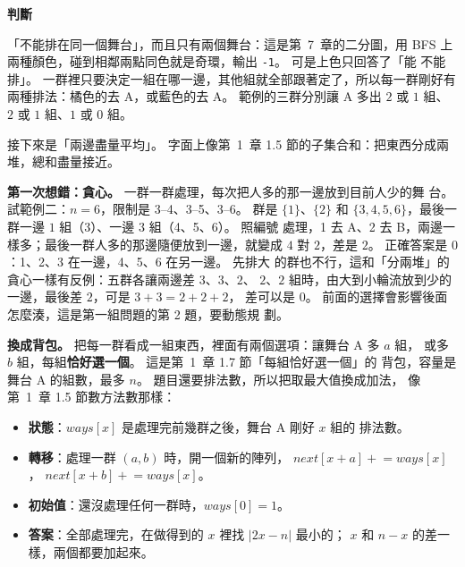 \begin{center}
\label{fig:cap-stages}
\end{center}

\textbf{判斷}

「不能排在同一個舞台」，而且只有兩個舞台：這是第~7~章的二分圖，用 BFS
上兩種顏色，碰到相鄰兩點同色就是奇環，輸出 \texttt{-1}。 可是上色只回答了「能
不能排」。 一群裡只要決定一組在哪一邊，其他組就全部跟著定了，所以每一群剛好有
兩種排法：橘色的去 A，或藍色的去 A。 範例的三群分別讓 A 多出 $2$ 或 $1$ 組、
$2$ 或 $1$ 組、$1$ 或 $0$ 組。

接下來是「兩邊盡量平均」。 字面上像第~1~章 1.5 節的子集合和：把東西分成兩
堆，總和盡量接近。

\textbf{第一次想錯：貪心。} 一群一群處理，每次把人多的那一邊放到目前人少的舞
台。 試範例二：$n = 6$，限制是 3--4、3--5、3--6。 群是 $\{1\}$、$\{2\}$ 和
$\{3, 4, 5, 6\}$，最後一群一邊 $1$ 組（3）、一邊 $3$ 組（4、5、6）。 照編號
處理，1 去 A、2 去 B，兩邊一樣多；最後一群人多的那邊隨便放到一邊，就變成 $4$
對 $2$，差是 $2$。 正確答案是 $0$：1、2、3 在一邊，4、5、6 在另一邊。 先排大
的群也不行，這和「分兩堆」的貪心一樣有反例：五群各讓兩邊差 $3$、$3$、$2$、
$2$、$2$ 組時，由大到小輪流放到少的一邊，最後差 $2$，可是 $3 + 3 = 2 + 2 + 2$，
差可以是 $0$。 前面的選擇會影響後面怎麼湊，這是第一組問題的第 2 題，要動態規
劃。

\textbf{換成背包。} 把每一群看成一組東西，裡面有兩個選項：讓舞台 A 多 $a$ 組，
或多 $b$ 組，每組\textbf{恰好選一個}。 這是第~1~章 1.7 節「每組恰好選一個」的
背包，容量是舞台 A 的組數，最多 $n$。 題目還要排法數，所以把取最大值換成加法，
像第~1~章 1.5 節數方法數那樣：

\begin{itemize}
\item \textbf{狀態}：$\mathit{ways}[x]$ 是處理完前幾群之後，舞台 A 剛好 $x$ 組的
排法數。
\item \textbf{轉移}：處理一群 $(a, b)$ 時，開一個新的陣列，
$\mathit{next}[x + a] \mathrel{+}= \mathit{ways}[x]$，
$\mathit{next}[x + b] \mathrel{+}= \mathit{ways}[x]$。
\item \textbf{初始值}：還沒處理任何一群時，$\mathit{ways}[0] = 1$。
\item \textbf{答案}：全部處理完，在做得到的 $x$ 裡找 $|2x - n|$ 最小的；
$x$ 和 $n - x$ 的差一樣，兩個都要加起來。
\end{itemize}

